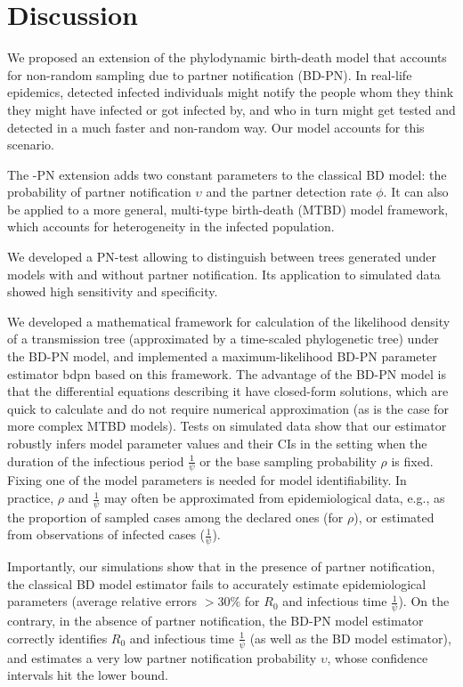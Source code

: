 \documentclass[a4paper,10pt]{article}
\begin{document}
\section{Discussion}
\label{disc}

We proposed an extension of the phylodynamic birth-death model that accounts for non-random sampling due to partner notification (BD-PN). In real-life epidemics, detected infected individuals might notify the people whom they think they might have infected or got infected by, and who in turn might get tested and detected in a much faster and non-random way. Our model accounts for this scenario.

The -PN extension adds two constant parameters to the classical BD model: the probability of partner notification $\upsilon$ and the partner detection rate $\phi$. It can also be applied to a more general, multi-type birth-death (MTBD) model framework, which accounts for heterogeneity in the infected population. 

We developed a PN-test allowing to distinguish between trees generated under models with and without partner notification. Its application to simulated data showed high sensitivity and specificity. 

We developed a mathematical framework for calculation of the likelihood density of a transmission tree (approximated by a time-scaled phylogenetic tree) under the BD-PN model, and implemented a maximum-likelihood BD-PN parameter estimator bdpn based on this framework. The advantage of the BD-PN model is that the differential equations describing it have closed-form solutions, which are quick to calculate and do not require numerical approximation (as is the case for more complex MTBD models). Tests on simulated data show that our estimator robustly infers model parameter values and their CIs in the setting when the duration of the infectious period $\frac{1}{\psi}$ or the base sampling probability $\rho$ is fixed. Fixing one of the model parameters is needed for model identifiability. In practice, $\rho$ and $\frac{1}{\psi}$ may often be approximated from epidemiological data, e.g., as the proportion of sampled cases among the declared ones (for $\rho$), or estimated from observations of infected cases ($\frac{1}{\psi}$). 

Importantly, our simulations show that in the presence of partner notification, the classical BD model estimator fails to accurately estimate epidemiological parameters (average relative errors $> 30\%$ for $R_0$ and infectious time $\frac{1}{\psi}$). On the contrary, in the absence of partner notification, the BD-PN model estimator correctly identifies $R_0$ and infectious time $\frac{1}{\psi}$ (as well as the BD model estimator), and estimates a very low partner notification probability $\upsilon$, whose confidence intervals hit the lower bound.
\end{document}
